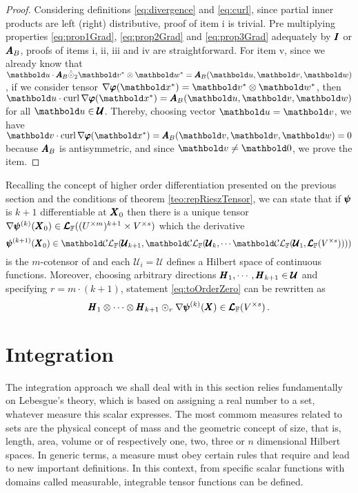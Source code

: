 {\footnotesize
\begin{proof}
Considering definitions \eqref{eq:divergence} and \eqref{eq:curl}, since partial inner products are left (right) distributive, proof of item i is trivial. Pre multiplying properties \eqref{eq:prop1Grad}, \eqref{eq:prop2Grad} and \eqref{eq:prop3Grad} adequately by $\pmb{I}$ or $\pmb{A}_B$, proofs of items i, ii, iii and iv are straightforward. For item v, since we already know that $\vto{u}\cdot\tnr{A}_B\hat{\odot}_2\vto{v}^*\otimes\vto{w}^*=\tnr{A}_B(\vto{u},\vto{v},\vto{w})$, if we consider tensor $\fua{{\nabla \tnr{\varphi}}}{\vto{x}^*}=\vto{v}^*\otimes\vto{w}^*$, then $\vto{u}\cdot\fua{\crl{\nabla \tnr{\varphi}}}{\vto{x}^*}=\tnr{A}_B(\vto{u},\vto{v},\vto{w})$ for all $\vto{u}\in\pmb{\mathcal{U}}$. Thereby, choosing vector $\vto{u}=\vto{v}$, we have $\vto{v}\cdot\fua{\crl{\nabla \tnr{\varphi}}}{\vto{x}^*}=\tnr{A}_B(\vto{v},\vto{v},\vto{w})=0$ because $\pmb{A}_B$ is antisymmetric, and since $\vto{v}\neq\vto{0}$, we prove the item.
\end{proof}}


Recalling the concept of higher order differentiation presented on the previous section and the conditions of theorem \ref{teo:repRieszTensor}, we can state that if $\pmb{\psi}$ is $k+1$ differentiable at $\pmb{X}_0$ then there is a unique tensor $\nabla\pmb{\psi}^{(k)}(\pmb{X}_0)\in\pmb{\mathcal{L}}_{\mathbb{F}}((U^{\times m})^{k+1}\times V^{\times s})$ which the derivative
\begin{equation*}
\fua{\tnr{\psi}^{(k+1)}}{\tnr{X}_0}\in{\evlc{\cam{F}}{\pmb{\mathcal{U}}_{k+1}}{\evlc{\cam{F}}{\pmb{\mathcal{U}}_k}{\cdots\evlc{\cam{F}}{\pmb{\mathcal{U}}_{1}}{\ete{\cam{F}}{V^{\times s}}}}}}
\end{equation*}
is the $m$-cotensor of and each $\pmb{\mathcal{U}}_i=\pmb{\mathcal{U}}$ defines a Hilbert space of continuous functions. Moreover, choosing arbitrary directions $\pmb{H}_1,\cdots,\pmb{H}_{k+1}\in\pmb{\mathcal{U}}$ and specifying $r=m\cdot(k+1)$, statement \eqref{eq:toOrderZero} can be rewritten as
\begin{equation}
\pmb{H}_{1}\otimes\cdots\otimes\pmb{H}_{k+1}\odot_r\nabla\pmb{\psi}^{(k)}(\pmb{X})\in\pmb{\mathcal{L}}_{\mathbb{F}}(V^{\times s})\,.
\end{equation}


\section{Integration}

The integration approach we shall deal with in this section relies fundamentally on Lebesgue's theory, which is based on assigning a real number to a set, whatever measure this scalar expresses. The most commom measures related to sets are the physical concept of mass and the geometric concept of size, that is, length, area, volume or  of respectively one, two, three or $n$ dimensional Hilbert spaces. In generic terms, a measure must obey certain rules that require and lead to new important definitions. In this context, from specific scalar functions with domains called measurable, integrable tensor functions can be defined.

